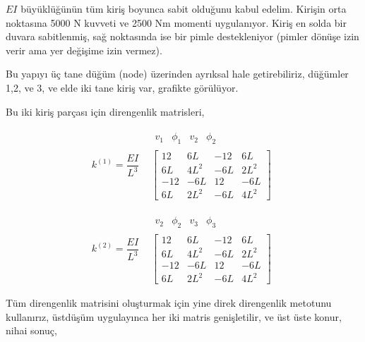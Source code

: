 \documentclass[12pt,fleqn]{article}\usepackage{../../common}
\begin{document}
$EI$ büyüklüğünün tüm kiriş boyunca sabit olduğunu kabul edelim. Kirişin orta
noktasına 5000 N kuvveti ve 2500 Nm momenti uygulanıyor. Kiriş en solda bir
duvara sabitlenmiş, sağ noktasında ise bir pimle destekleniyor (pimler
dönüşe izin verir ama yer değişime izin vermez). 

Bu yapıyı üç tane düğüm (node) üzerinden ayrıksal hale getirebiliriz,
düğümler 1,2, ve 3, ve elde iki tane kiriş var, grafikte görülüyor.

Bu iki kiriş parçası için direngenlik matrisleri,

$$
k^{(1)} = \frac{EI}{L^3}
\begin{array}{cc} & \begin{array}{rrrr} v_1 & \phi_1 & v_2 & \phi_2 \end{array} \\ &
\left[
\begin{array}{cccc}
  12 & 6L & -12 & 6L \\
  6L & 4L^2 & -6L & 2L^2 \\
  -12 & -6L & 12 & -6L \\
  6L & 2L^2 & -6L & 4L^2
\end{array}
\right]
\end{array} 
$$

$$
k^{(2)} = \frac{EI}{L^3}
\begin{array}{cc} & \begin{array}{rrrr} v_2 & \phi_2 & v_3 & \phi_3 \end{array} \\ &
\left[
\begin{array}{cccc}
  12 & 6L & -12 & 6L \\
  6L & 4L^2 & -6L & 2L^2 \\
  -12 & -6L & 12 & -6L \\
  6L & 2L^2 & -6L & 4L^2
\end{array}
\right]
\end{array} 
$$

Tüm direngenlik matrisini oluşturmak için yine direk direngenlik metotunu
kullanırız, üstdüşüm uygulayınca her iki matris genişletilir, ve üst üste konur,
nihai sonuç,
\end{document}
